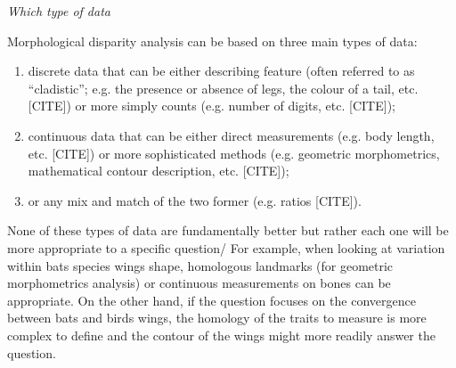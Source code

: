\documentclass[12pt,letterpaper]{article}
\renewcommand{\subsection}[1]{%
\bigskip
\begin{center}
\begin{large}
\normalfont\itshape #1
\end{large}
\end{center}}
\begin{document}
\subsection{Which type of data}
Morphological disparity analysis can be based on three main types of data:
\begin{enumerate}
    \item discrete data that can be either describing feature (often referred to as ``cladistic''; e.g. the presence or absence of legs, the colour of a tail, etc. [CITE]) or more simply counts (e.g. number of digits, etc. [CITE]);
    \item continuous data that can be either direct measurements (e.g. body length, etc. [CITE]) or more sophisticated methods (e.g. geometric morphometrics, mathematical contour description, etc. [CITE]);
    \item or any mix and match of the two former (e.g. ratios [CITE]).
\end{enumerate}
None of these types of data are fundamentally better but rather each one will be more appropriate to a specific question/
For example, when looking at variation within bats species wings shape, homologous landmarks (for geometric morphometrics analysis) or continuous measurements on bones can be appropriate.
On the other hand, if the question focuses on the convergence between bats and birds wings, the homology of the traits to measure is more complex to define and the contour of the wings might more readily answer the question.
\end{document}
